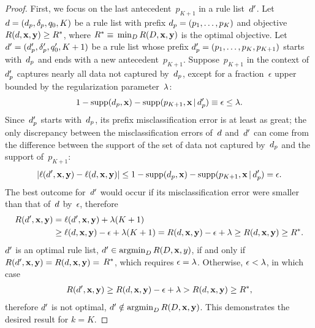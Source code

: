 \begin{proof}
First, we focus on the last antecedent~$p_{K+1}$ in a rule list~${d}'$.
%
Let ${{d} = (d_p, \delta_p, q_0, K)}$
be a rule list with prefix ${d_p = (p_1, \dots, p_K)}$
and objective ${R({d}, \mathbf{x}, \mathbf{y}) \ge R^*}$, where
${R^* \equiv}$ ${\min_{{D}} R({D}, \mathbf{x}, \mathbf{y})}$
is the optimal objective.
%
Let ${{d}' = (d_p', \delta_p', q_0', K + 1)}$
be a rule list whose prefix ${d_p' = (p_1, \dots, p_K, p_{K+1})}$
starts with~$d_p$ and ends with a new antecedent~$p_{K+1}$.
%
Suppose~$p_{K+1}$ in the context of~$d_p'$ captures nearly all
data not captured by~$d_p$, except for a fraction~$\epsilon$
upper bounded by the regularization parameter~${\lambda}$:
\begin{align*}
1 - \textnormal{supp}(d_p, \mathbf{x}) - \textnormal{supp}(p_{K+1}, \mathbf{x} \,|\, d_p') \equiv \epsilon \le {\lambda}.
\end{align*}
%
Since~$d_p'$ starts with~$d_p$,
its prefix misclassification error is at least as great;
the only discrepancy between the misclassification errors
of~${d}$ and~${d}'$ can come from the difference between the support of
the set of data not captured by~$d_p$ and the support of~$p_{K+1}$:
\begin{align*}
| \ell({d}', \mathbf{x}, \mathbf{y}) - \ell({d}, \mathbf{x}, \mathbf{y}) | \le
1 - \textnormal{supp}(d_p, \mathbf{x}) - \textnormal{supp}(p_{K+1}, \mathbf{x} \,|\, d_p') = \epsilon.
\end{align*}
The best outcome for~${d}'$ would occur if its misclassification
error were smaller than that of~${d}$ by~$\epsilon$,
%
therefore
\begin{align*}
R({d}', \mathbf{x}, \mathbf{y}) &= \ell({d}', \mathbf{x}, \mathbf{y}) + {\lambda} (K+1) \\
&\ge \ell({d}, \mathbf{x}, \mathbf{y}) - \epsilon + {\lambda}(K+1)
= R({d}, \mathbf{x}, \mathbf{y}) - \epsilon + {\lambda} \ge R({d}, \mathbf{x}, \mathbf{y}) \ge R^*.
\end{align*}
${d}'$ is an optimal rule list,
\ie ${{d}' \in \operatorname*{argmin}_{{D}} R({D}, \mathbf{x}, y)}$,
if and only if ${R({d}', \mathbf{x}, \mathbf{y}) = R({d}, \mathbf{x}, \mathbf{y}) =}$ ${R^*}$,
which requires ${\epsilon = {\lambda}}$.
%
Otherwise, ${\epsilon < {\lambda}}$, in which case
\begin{align*}
R({d}', \mathbf{x}, \mathbf{y}) \ge R({d}, \mathbf{x}, \mathbf{y}) - \epsilon + {\lambda}
> R({d}, \mathbf{x}, \mathbf{y}) \ge R^*,
\end{align*}
therefore ${d}'$ is not optimal, \ie  ${{d}' \notin \operatorname*{argmin}_{{D}} R({D}, \mathbf{x}, \mathbf{y})}$.
%
This demonstrates the desired result for ${k = K}$.


\end{proof}
